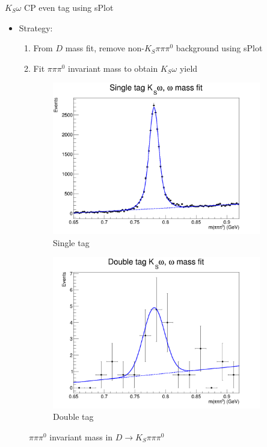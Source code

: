 \documentclass{beamer}
\begin{document}
\begin{frame}{$K_S\omega$ CP even tag using sPlot}
  \begin{itemize}
    \item{Strategy:}
    \begin{enumerate}
      \item{From $D$ mass fit, remove non-$K_S\pi\pi\pi^0$ background using sPlot}
      \item{Fit $\pi\pi\pi^0$ invariant mass to obtain $K_S\omega$ yield}
    \end{enumerate}
  \end{itemize}
  \begin{figure}
    \centering
    \vspace{-0.2cm}
    \begin{subfigure}{0.40\textwidth}
      \includegraphics[width = 1.0\textwidth]{Plots/KSomega_ST_Mpipipi0.png}
      \caption{Single tag}
    \end{subfigure}%
    \begin{subfigure}{0.40\textwidth}
      \includegraphics[width = 1.0\textwidth]{Plots/KSomega_DT_Mpipipi0.png}
      \caption{Double tag}
    \end{subfigure}
    \caption{$\pi\pi\pi^0$ invariant mass in $D\to K_S\pi\pi\pi^0$}
  \end{figure}
\end{frame}    
\end{document}
